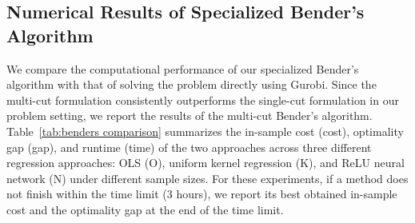 \documentclass[onefignum,onetabnum]{siamart251216}
\begin{document}
\subsection{Numerical Results of Specialized Bender's Algorithm}
We compare the computational performance of our specialized Bender's algorithm with that of solving the problem directly using Gurobi. Since the multi-cut formulation consistently outperforms the single-cut formulation in our problem setting, we report the results of the multi-cut Bender's algorithm. Table\ \ref{tab:benders comparison} summarizes the in-sample cost (cost), optimality gap (gap), and runtime (time) of the two approaches across three different regression approaches: OLS (O), uniform kernel regression (K), and ReLU neural network (N) under different sample sizes.  For these experiments, if a method does not finish within the time limit (3 hours), we report its best obtained in-sample cost and the optimality gap at the end of the time limit. 
\end{document}

